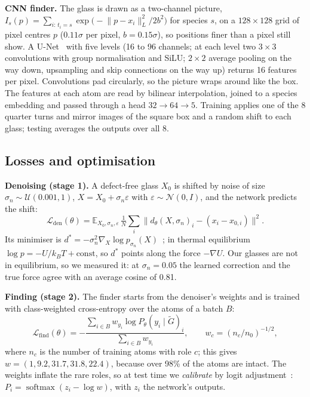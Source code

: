\documentclass[10pt]{article}
\begin{document}
\textbf{CNN finder.} The glass is drawn as a two-channel picture, $I_s(p)=\sum_{i:\,t_i=s}\exp\big(-\lVert p-x_i\rVert_L^2/2b^2\big)$ for species $s$, on a $128\times128$ grid of pixel centres $p$ ($0.11\sigma$ per pixel, $b=0.15\sigma$), so positions finer than a pixel still show. A U-Net~\citep{ronneberger2015unet} with five levels (16 to 96 channels; at each level two $3\times3$ convolutions with group normalisation and SiLU; $2\times2$ average pooling on the way down, upsampling and skip connections on the way up) returns 16 features per pixel. Convolutions pad circularly, so the picture wraps around like the box. The features at each atom are read by bilinear interpolation, joined to a species embedding and passed through a head $32\to64\to5$. Training applies one of the 8 quarter turns and mirror images of the square box and a random shift to each glass; testing averages the outputs over all 8.

\subsection{Losses and optimisation}

\textbf{Denoising (stage 1).} A defect-free glass $X_0$ is shifted by noise of size $\sigma_n\sim\mathcal U(0.001,1)$, $X=X_0+\sigma_n\varepsilon$ with $\varepsilon\sim\mathcal N(0,I)$, and the network predicts the shift:
\begin{equation}
\mathcal L_{\text{den}}(\theta)=\mathbb E_{X_0,\sigma_n,\varepsilon}\,\tfrac{1}{N}\textstyle\sum_i\big\lVert d_\theta(X,\sigma_n)_i-(x_i-x_{0,i})\big\rVert^2 .
\label{eq:den}
\end{equation}
Its minimiser is $d^*=-\sigma_n^2\nabla_X\log p_{\sigma_n}(X)$~\citep{vincent2011,efron2011}; in thermal equilibrium $\log p=-U/k_BT+\text{const}$, so $d^*$ points along the force $-\nabla U$. Our glasses are not in equilibrium, so we measured it: at $\sigma_n=0.05$ the learned correction and the true force agree with an average cosine of 0.81.

\textbf{Finding (stage 2).} The finder starts from the denoiser's weights and is trained with class-weighted cross-entropy over the atoms of a batch $B$:
\begin{equation}
\mathcal L_{\text{find}}(\theta)=-\frac{\sum_{i\in B} w_{y_i}\log P_\theta(y_i\mid\tilde G)_i}{\sum_{i\in B} w_{y_i}},\qquad w_c=(n_c/n_0)^{-1/2},
\label{eq:find}
\end{equation}
where $n_c$ is the number of training atoms with role $c$; this gives $w=(1, 9.2, 31.7, 31.8, 22.4)$, because over 98\% of the atoms are intact. The weights inflate the rare roles, so at test time we \emph{calibrate} by logit adjustment~\citep{menon2021}: $P_i=\operatorname{softmax}(z_i-\log w)$, with $z_i$ the network's outputs.
\end{document}
